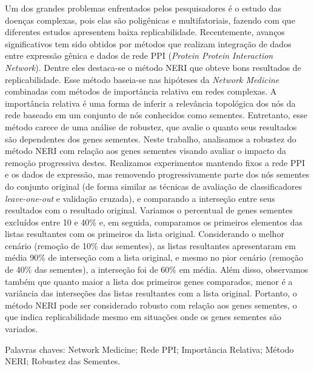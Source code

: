 \begin{resumo}

Um dos grandes problemas enfrentados pelos pesquisadores é o estudo das doenças complexas, pois elas são poligênicas e multifatoriais, fazendo com que diferentes estudos apresentem baixa replicabilidade.
Recentemente, avanços significativos tem sido obtidos por métodos que realizam integração de dados entre expressão gênica e dados de rede PPI (\textit{Protein Protein Interaction Network}).
Dentre eles destaca-se o método NERI que obteve bons resultados de replicabilidade.
Esse método baseia-se nas hipóteses da \textit{Network Medicine} combinadas com métodos de importância relativa em redes complexas.
A importância relativa é uma forma de inferir a relevância topológica dos nós da rede baseado em um conjunto de nós conhecidos como sementes. Entretanto, esse método carece de uma análise de robustez, que avalie o quanto seus resultados são dependentes dos genes sementes.
Neste trabalho, analisamos a robustez do método NERI com relação aos genes sementes visando avaliar o impacto da remoção progressiva destes.
Realizamos experimentos mantendo fixos a rede PPI e os dados de expressão, 
mas removendo progressivamente parte dos nós sementes do conjunto original (de forma similar as técnicas de avaliação de classificadores \textit{leave-one-out} e validação cruzada), e comparando a interseção entre seus resultados com o resultado original.
%
Variamos o percentual de genes sementes excluídos entre 10 e 40\% e, em seguida, comparamos os primeiros elementos das listas resultantes com os primeiros da lista original.
%
Considerando o melhor cenário (remoção de 10\% das sementes), as listas resultantes apresentaram em média 90\% de interseção com a lista original, e mesmo no pior cenário (remoção de 40\% das sementes), a interseção foi de 60\% em média.
Além disso, observamos também que quanto maior a lista dos primeiros genes comparados, menor é a variância das interseções das listas resultantes com a lista original.
%
Portanto, o método NERI pode ser considerado robusto com relação aos genes sementes, o que indica replicabilidade mesmo em situações onde os genes sementes são variados.


Palavras chaves: Network Medicine; Rede PPI; Importância Relativa; Método NERI; Robustez das Sementes.
\end{resumo}
